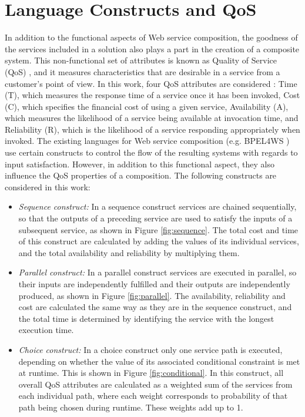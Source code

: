 \section{Language Constructs and QoS}

In addition to the functional aspects of Web service composition, the goodness of the services included in a solution also plays a part in the creation of a composite system. This non-functional set of attributes is known as Quality of Service (QoS) \cite{menasce2002qos}, and it measures characteristics that are desirable in a service from a customer's point of view. In this work, four QoS attributes are considered \cite{yu2013adaptive}: Time (T), which measures the response time of a service once it has been invoked, Cost (C), which specifies the financial cost of using a given service, Availability (A), which measures the likelihood of a service being available at invocation time, and Reliability (R), which is the likelihood of a service responding appropriately when invoked.
The existing languages for Web service composition (e.g. BPEL4WS \cite{wohed2003analysis}) use certain constructs to control the flow of the resulting systems with regards to input satisfaction. However, in addition to this functional aspect, they also influence the QoS properties of a composition. The following constructs are considered in this work:

\begin{itemize}
\item\textit{Sequence construct:} In a sequence construct services are chained sequentially, so that the outputs of a preceding service are used to satisfy the inputs of a subsequent service, as shown in Figure \ref{fig:sequence}. The total cost and time of this construct are calculated by adding the values of its individual services, and the total availability and reliability by multiplying them.
\item\textit{Parallel construct:} In a parallel construct services are executed in parallel, so their inputs are independently fulfilled and their outputs are independently produced, as shown in Figure \ref{fig:parallel}. The availability, reliability and cost are calculated the same way as they are in the sequence construct, and the total time is determined by identifying the service with the longest execution time. 
\item\textit{Choice construct:} In a choice construct only one service path is executed, depending on whether the value of its associated conditional constraint is met at runtime. This is shown in Figure \ref{fig:conditional}. In this construct, all overall QoS attributes are calculated as a weighted sum of the services from each individual path, where each weight corresponds to probability of that path being chosen during runtime. These weights add up to 1. 
\end{itemize}

